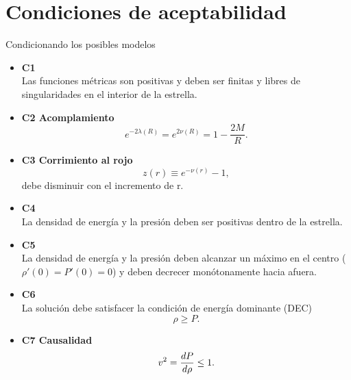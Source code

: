 \documentclass[11pt]{beamer}
\begin{document}
\section{Condiciones de aceptabilidad}
\begin{frame}{Condicionando los posibles modelos \footnotemark}
    \begin{itemize}
        \item \textbf{C1} \\
            Las funciones métricas son positivas y deben ser finitas y libres de singularidades en el
            interior de la estrella.
        \item \textbf{C2 Acomplamiento}  \\
            \begin{equation}
                e ^ { -2 \lambda(R) } =  e ^ {  2 \nu(R) } =  1 - \frac { 2 M } { R }.
            \end{equation}
        \item \textbf{C3 Corrimiento al rojo} \\
            \begin{equation}
                z(r)\equiv e^{-\nu(r)}-1,
            \end{equation}
            debe disminuir con el incremento de r.
    \end{itemize}
\end{frame}

\begin{frame}{}
    \begin{itemize}
        \item \textbf{C4} \\
        La densidad de energía y la presión deben ser positivas dentro de la estrella.
        \item \textbf{C5} \\
        La densidad de energía y la presión deben alcanzar un máximo en el centro ($\rho'(0)=P'(0)=0$) y deben decrecer monótonamente hacia afuera.
        \item \textbf{C6} \\
        La solución debe satisfacer la condición de energía dominante (DEC) 
        \begin{equation}
         \rho \geq P.   
        \end{equation}
        \item \textbf{C7 Causalidad} \\ 
        \begin{equation}
            v^2=\dv{P}{\rho}\leq 1.
        \end{equation}
    \end{itemize}
\end{frame}
\end{document}
